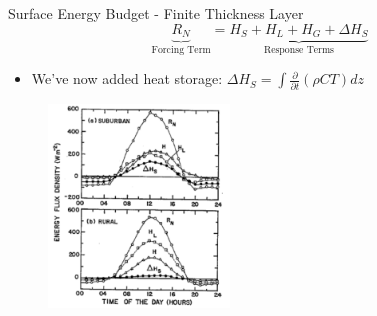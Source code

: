 \begin{frame}{Surface Energy Budget - Finite Thickness Layer}
$$\underbrace{R_N}_{\text{Forcing Term}} = \underbrace{H_S + H_L + H_G + \Delta H_S}_{\text{Response Terms}}$$
\begin{itemize}
	\item We've now added heat storage: $\Delta H_S = \int \frac{\partial}{\partial t} (\rho CT) dz$
\end{itemize}
\begin{figure}
	\includegraphics[width=0.43\textwidth]{rad8.png}
\end{figure}
\end{frame}

